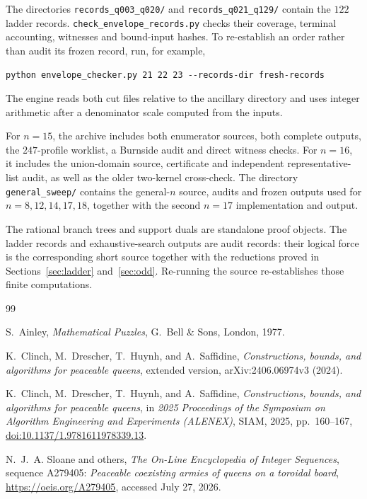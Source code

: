 \documentclass[11pt]{amsart}
\theoremstyle{definition}
\theoremstyle{remark}
\newcommand{\bs}{\discretionary{}{}{}}
\begin{document}
The directories \texttt{records\_\bs{}q003\_\bs{}q020/} and
\texttt{records\_\bs{}q021\_\bs{}q129/} contain the $122$ ladder records.
\texttt{check\_\bs{}envelope\_\bs{}records.py} checks their coverage,
terminal accounting, witnesses and bound-input hashes.  To re-establish an
order rather than audit its frozen record, run, for example,
\begin{verbatim}
python envelope_checker.py 21 22 23 --records-dir fresh-records
\end{verbatim}
The engine reads both cut files relative to the ancillary directory and uses
integer arithmetic after a denominator scale computed from the inputs.

For $n=15$, the archive includes both enumerator sources, both complete
outputs, the $247$-profile worklist, a Burnside audit and direct witness
checks.  For $n=16$, it includes the union-domain source, certificate and
independent representative-list audit, as well as the older two-kernel
cross-check.  The directory \texttt{general\_\bs{}sweep/} contains the
general-$n$ source, audits and frozen outputs used for $n=8,12,14,17,18$,
together with the second $n=17$ implementation and output.

The rational branch trees and support duals are standalone proof objects.
The ladder records and exhaustive-search outputs are audit records: their
logical force is the corresponding short source together with the reductions
proved in Sections~\ref{sec:ladder} and~\ref{sec:odd}.  Re-running the source
re-establishes those finite computations.

\fussy

\begin{thebibliography}{99}

S.~Ainley,
\emph{Mathematical Puzzles},
G.~Bell \& Sons, London, 1977.

K.~Clinch, M.~Drescher, T.~Huynh, and A.~Saffidine,
\emph{Constructions, bounds, and algorithms for peaceable queens},
extended version, arXiv:2406.06974v3 (2024).

K.~Clinch, M.~Drescher, T.~Huynh, and A.~Saffidine,
\emph{Constructions, bounds, and algorithms for peaceable queens},
in \emph{2025 Proceedings of the Symposium on Algorithm Engineering and
Experiments (ALENEX)}, SIAM, 2025, pp.~160--167,
\href{https://doi.org/10.1137/1.9781611978339.13}
{doi:10.1137/1.9781611978339.13}.

N.~J.~A. Sloane and others,
\emph{The On-Line Encyclopedia of Integer Sequences}, sequence A279405:
\emph{Peaceable coexisting armies of queens on a toroidal board},
\url{https://oeis.org/A279405}, accessed July 27, 2026.

\end{thebibliography}
\end{document}
